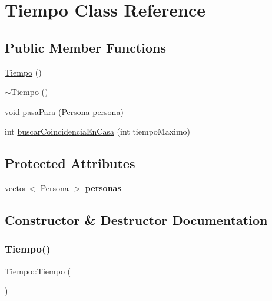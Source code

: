 \hypertarget{classTiempo}{}\section{Tiempo Class Reference}
\label{classTiempo}
\subsection*{Public Member Functions}
\begin{DoxyCompactItemize}
\item 
\hyperlink{classTiempo_ac63916ddfc9fc3e8fa15cfb615977b89}{Tiempo} ()
\item 
\hyperlink{classTiempo_a39166529f35612f25e2f511680e0be6f}{$\sim$\+Tiempo} ()
\item 
void \hyperlink{classTiempo_a843c070849caac4ff5122c4747bdd44e}{pasa\+Para} (\hyperlink{classPersona}{Persona} persona)
\item 
int \hyperlink{classTiempo_a9e8e384ecf22079bb34d2fbc39ff24b3}{buscar\+Coincidencia\+En\+Casa} (int tiempo\+Maximo)
\end{DoxyCompactItemize}
\subsection*{Protected Attributes}
\begin{DoxyCompactItemize}
\item 
\mbox{\label{classTiempo_a894e7c8523688a8cb6cfb71f831253e7}} 
vector$<$ \hyperlink{classPersona}{Persona} $>$ {\bfseries personas}
\end{DoxyCompactItemize}


\subsection{Constructor \& Destructor Documentation}
\mbox{\label{classTiempo_ac63916ddfc9fc3e8fa15cfb615977b89}} 
\subsubsection{\texorpdfstring{Tiempo()}{Tiempo()}}
{\footnotesize\ttfamily Tiempo\+::\+Tiempo (\begin{DoxyParamCaption}{ }\end{DoxyParamCaption})}

